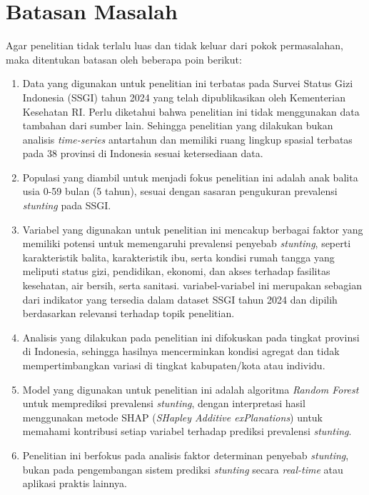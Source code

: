\section{Batasan Masalah} \label{I.Batasan}
Agar penelitian tidak terlalu luas dan tidak keluar dari pokok permasalahan, maka ditentukan batasan oleh beberapa poin berikut: \par

\begin{enumerate}[noitemsep]
    \item Data yang digunakan untuk penelitian ini terbatas pada Survei Status Gizi Indonesia (SSGI) tahun 2024 yang telah dipublikasikan oleh Kementerian Kesehatan RI. Perlu diketahui bahwa penelitian ini tidak menggunakan data tambahan dari sumber lain. Sehingga penelitian yang dilakukan bukan analisis \textit{time-series} antartahun dan memiliki ruang lingkup spasial terbatas pada 38 provinsi di Indonesia sesuai ketersediaan data.
    \item Populasi yang diambil untuk menjadi fokus penelitian ini adalah anak balita usia 0-59 bulan (5 tahun), sesuai dengan sasaran pengukuran prevalensi \textit{stunting} pada SSGI.
    \item Variabel yang digunakan untuk penelitian ini mencakup berbagai faktor yang memiliki potensi untuk memengaruhi prevalensi penyebab \textit{stunting}, seperti karakteristik balita, karakteristik ibu, serta kondisi rumah tangga yang meliputi status gizi, pendidikan, ekonomi, dan akses terhadap fasilitas kesehatan, air bersih, serta sanitasi. variabel-variabel ini merupakan sebagian dari indikator yang tersedia dalam dataset SSGI tahun 2024 dan dipilih berdasarkan relevansi terhadap topik penelitian.
    \item Analisis yang dilakukan pada penelitian ini difokuskan pada tingkat provinsi di Indonesia, sehingga hasilnya mencerminkan kondisi agregat dan tidak mempertimbangkan variasi di tingkat kabupaten/kota atau individu.
    \item Model yang digunakan untuk penelitian ini adalah algoritma \textit{Random Forest} untuk memprediksi prevalensi \textit{stunting}, dengan interpretasi hasil menggunakan metode SHAP (\textit{SHapley Additive exPlanations}) untuk memahami kontribusi setiap variabel terhadap prediksi prevalensi \textit{stunting}.
    \item Penelitian ini berfokus pada analisis faktor determinan penyebab \textit{stunting}, bukan pada pengembangan sistem prediksi \textit{stunting} secara \textit{real-time} atau aplikasi praktis lainnya.
\end{enumerate}

